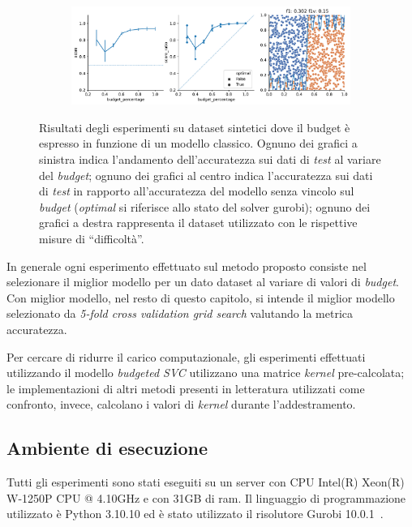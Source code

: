 \begin{figure}
\begin{subfigure}{.5\textwidth}
    \end{subfigure}%
    \hfill
    \begin{subfigure}{.5\textwidth}
        \centering
        \includegraphics[width=\textwidth]{img/2d/15.pdf}
    \end{subfigure}%
    \caption{Risultati degli esperimenti su dataset sintetici dove il budget è espresso in funzione di un modello classico. Ognuno dei grafici a sinistra indica l'andamento dell'accuratezza sui dati di \emph{test} al variare del \emph{budget}; ognuno dei grafici al centro indica l'accuratezza sui dati di \emph{test} in rapporto all'accuratezza del modello senza vincolo sul \emph{budget} (\emph{optimal} si riferisce allo stato del solver gurobi); ognuno dei grafici a destra rappresenta il dataset utilizzato con le rispettive misure di ``difficoltà''.}
\label{fig:risultati_2d}
\end{figure}


In generale ogni esperimento effettuato sul metodo proposto consiste nel selezionare il miglior modello per un dato dataset al variare di valori di \emph{budget}.
Con miglior modello, nel resto di questo capitolo, si intende il miglior modello selezionato da \emph{5-fold cross validation grid search} valutando la metrica accuratezza. 

Per cercare di ridurre il carico computazionale, gli esperimenti effettuati utilizzando il modello \emph{budgeted SVC} utilizzano una matrice \emph{kernel} pre-calcolata; le implementazioni di altri metodi presenti in letteratura utilizzati come confronto, invece, calcolano i valori di \emph{kernel} durante l'addestramento.

\subsection{Ambiente di esecuzione}
Tutti gli esperimenti sono stati eseguiti su un server con CPU Intel(R) Xeon(R) W-1250P CPU @ 4.10GHz e con 31GB di ram. Il linguaggio di programmazione utilizzato è Python 3.10.10 ed è stato utilizzato il risolutore Gurobi 10.0.1~\cite{gurobi}.


